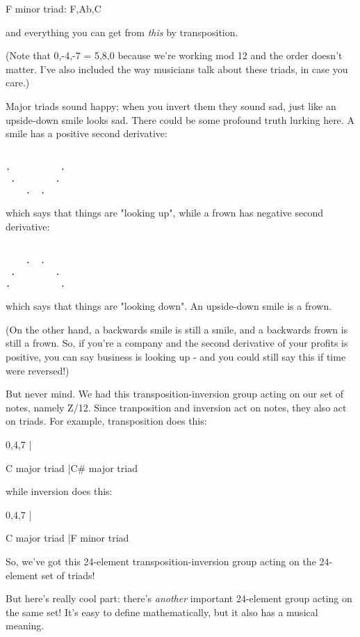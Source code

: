                   
   F minor triad: {F,Ab,C}

and everything you can get from \emph{this} by transposition.  

(Note that {0,-4,-7} = {5,8,0} because we're working mod 12
and the order doesn't matter.  I've also included the way musicians
talk about these triads, in case you care.)

Major triads sound happy; when you invert them they sound sad, 
just like an upside-down smile looks sad.  There could be some
profound truth lurking here.  A smile has a positive second 
derivative:


\begin{verbatim}

.          .
 .        .
    .  .
\end{verbatim}
    
which says that things are "looking up", while a frown has negative 
second derivative:


\begin{verbatim}

    .  .
 .        .
.          .
\end{verbatim}
    
which says that things are "looking down".  An upside-down smile
is a frown.  

(On the other hand, a backwards smile is still a smile, and a 
backwards frown is still a frown.  So, if you're a company and 
the second derivative of your profits is positive, you can say 
business is looking up - and you could still say this if time 
were reversed!)

But never mind.  We had this transposition-inversion group acting 
on our set of notes, namely Z/12.  Since tranposition and inversion
act on notes, they also act on triads.  For example, transposition 
does this:

{0,4,7} |               
                  
                  
 C major triad |\to  C# major triad

while inversion does this:

{0,4,7} |  
                  
                  
              C major triad |\to  F minor triad

So, we've got this 24-element transposition-inversion group 
acting on the 24-element set of triads!   

But here's really cool part: there's \emph{another} important 
24-element group acting on the same set!  It's easy to define 
mathematically, but it also has a musical meaning.

